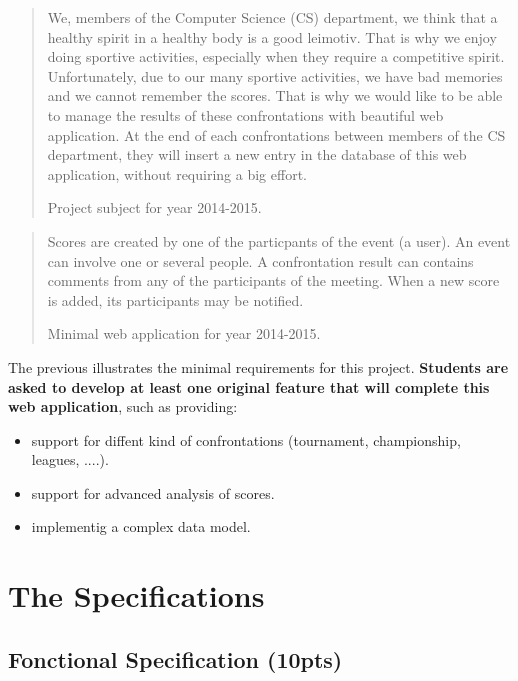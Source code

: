 \documentclass{article}         %
\begin{document}
\begin{quotation}
We, members of the Computer Science (CS) department, we think that a healthy 
spirit in a healthy body is a good leimotiv. That is why we enjoy doing sportive
activities, especially when they require a competitive spirit. Unfortunately, 
due to our many sportive activities, we have bad memories and we cannot remember
the scores. That is why we would like to be able to manage the results of these
confrontations with beautiful web application. At the end of each confrontations
between members of the CS department, they will insert a new entry in the 
database of this web application, without requiring a big effort.\par 
\raggedleft Project subject for year 2014-2015.
\end{quotation}

\begin{quotation}
Scores are created by one of the particpants of the event (a user). An event
can involve one or several people. A confrontation result can contains comments 
from any of the participants of the meeting. When a new score is added, its
participants may be notified.\par \raggedleft Minimal web application for year 
2014-2015.
\end{quotation}

The previous illustrates the minimal requirements for this project. \textbf{
Students are asked to develop at least one original feature that will complete 
this web application}, such as providing:

\begin{itemize}
  \item support for diffent kind of confrontations (tournament, championship, 
  leagues, ....).
  \item support for advanced analysis of scores.
  \item implementig a complex data model.
\end{itemize}

\section{The Specifications}
\label{specs}

\subsection{Fonctional Specification (10pts)}
\end{document}
